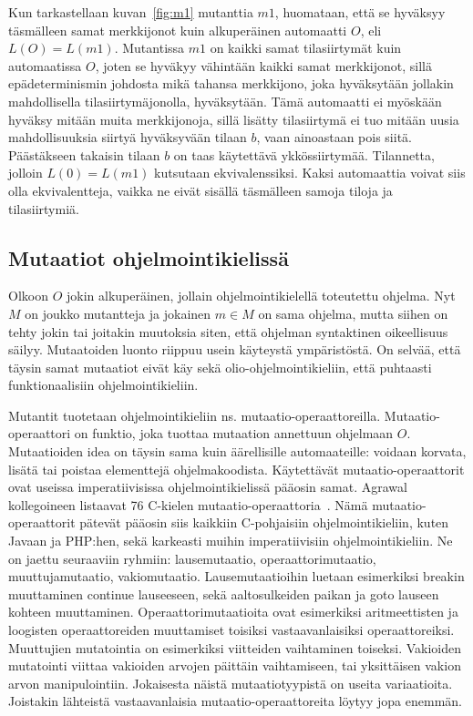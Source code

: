 \documentclass[finnish]{tktltiki2}
\begin{document}
Kun tarkastellaan kuvan~\ref{fig:m1} mutanttia $m1$, huomataan, että se hyväksyy täsmälleen samat merkkijonot kuin alkuperäinen automaatti $O$, eli $L(O) = L(m1)$. Mutantissa $m1$ on kaikki samat tilasiirtymät kuin automaatissa $O$, joten se hyväkyy vähintään kaikki samat merkkijonot, sillä epädeterminismin johdosta mikä tahansa merkkijono, joka hyväksytään jollakin mahdollisella tilasiirtymäjonolla, hyväksytään. Tämä automaatti ei myöskään hyväksy mitään muita merkkijonoja, sillä lisätty tilasiirtymä ei tuo mitään uusia mahdollisuuksia siirtyä hyväksyvään tilaan $b$, vaan ainoastaan pois siitä. Päästäkseen takaisin tilaan $b$ on taas käytettävä ykkössiirtymää. Tilannetta, jolloin $L(0) = L(m1)$ kutsutaan ekvivalenssiksi. Kaksi automaattia voivat siis olla ekvivalentteja, vaikka ne eivät sisällä täsmälleen samoja tiloja ja tilasiirtymiä.
 
\subsection{Mutaatiot ohjelmointikielissä}
Olkoon $O$ jokin alkuperäinen, jollain ohjelmointikielellä toteutettu ohjelma. Nyt $M$ on joukko mutantteja ja jokainen $m\in M$ on sama ohjelma, mutta siihen on tehty jokin tai joitakin muutoksia siten, että ohjelman syntaktinen oikeellisuus säilyy. Mutaatoiden luonto riippuu usein käyteystä ympäristöstä. On selvää, että täysin samat mutaatiot eivät käy sekä olio-ohjelmointikieliin, että puhtaasti funktionaalisiin ohjelmointikieliin.

Mutantit tuotetaan ohjelmointikieliin ns. mutaatio-operaattoreilla. Mutaatio-operaattori on funktio, joka tuottaa mutaation annettuun ohjelmaan $O$. Mutaatioiden idea on täysin sama kuin äärellisille automaateille: voidaan korvata, lisätä tai poistaa elementtejä ohjelmakoodista. Käytettävät mutaatio-operaattorit ovat useissa imperatiivisissa ohjelmointikielissä pääosin samat. Agrawal kollegoineen listaavat 76 C-kielen mutaatio-operaattoria~\cite{AgrawalDHHHKMMS89}. Nämä mutaatio-operaattorit pätevät pääosin siis kaikkiin C-pohjaisiin ohjelmointikieliin, kuten Javaan ja PHP:hen, sekä karkeasti muihin imperatiivisiin ohjelmointikieliin. Ne on jaettu seuraaviin ryhmiin: lausemutaatio, operaattorimutaatio, muuttujamutaatio, vakiomutaatio. Lausemutaatioihin luetaan esimerkiksi breakin muuttaminen continue lauseeseen, sekä aaltosulkeiden paikan ja goto lauseen kohteen muuttaminen. Operaattorimutaatioita ovat esimerkiksi aritmeettisten ja loogisten operaattoreiden muuttamiset toisiksi vastaavanlaisiksi operaattoreiksi. Muuttujien mutatointia on esimerkiksi viitteiden vaihtaminen toiseksi. Vakioiden mutatointi viittaa vakioiden arvojen päittäin vaihtamiseen, tai yksittäisen vakion arvon manipulointiin. Jokaisesta näistä mutaatiotyypistä on useita variaatioita. Joistakin lähteistä vastaavanlaisia mutaatio-operaattoreita löytyy jopa enemmän.
\end{document}
